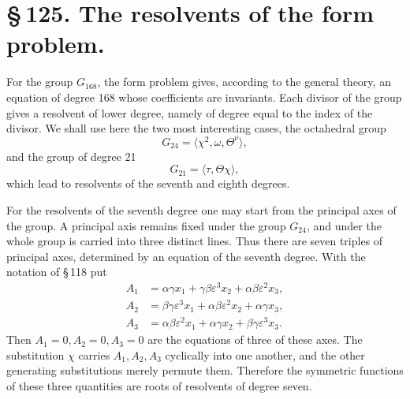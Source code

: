 \documentclass[11pt]{article}
\providecommand{\eps}{\varepsilon}
\providecommand{\eps}{\varepsilon}
\begin{document}
\section*{\S\,125. The resolvents of the form problem.}

For the group \(G_{168}\), the form problem gives, according to the general theory, an equation of degree 168 whose coefficients are invariants. Each divisor of the group gives a resolvent of lower degree, namely of degree equal to the index of the divisor. We shall use here the two most interesting cases, the octahedral group
\begin{equation}
G_{24}=\langle \chi^2,\omega,\Theta^\nu\rangle,
\tag{1}
\end{equation}
and the group of degree 21
\begin{equation}
G_{21}=\langle \tau,\Theta\chi\rangle,
\tag{2}
\end{equation}
which lead to resolvents of the seventh and eighth degrees.

For the resolvents of the seventh degree one may start from the principal axes of the group. A principal axis remains fixed under the group \(G_{24}\), and under the whole group is carried into three distinct lines. Thus there are seven triples of principal axes, determined by an equation of the seventh degree. With the notation of \S\,118 put
\begin{equation}
\begin{aligned}
A_1&=\alpha\gamma x_1+\gamma\beta\eps^3x_2+\alpha\beta\eps^2x_3,\\
A_2&=\beta\gamma\eps^3x_1+\alpha\beta\eps^2x_2+\alpha\gamma x_3,\\
A_3&=\alpha\beta\eps^2x_1+\alpha\gamma x_2+\beta\gamma\eps^3x_3.
\end{aligned}
\tag{3}
\end{equation}
Then \(A_1=0,A_2=0,A_3=0\) are the equations of three of these axes. The substitution \(\chi\) carries \(A_1,A_2,A_3\) cyclically into one another, and the other generating substitutions merely permute them. Therefore the symmetric functions of these three quantities are roots of resolvents of degree seven.
\end{document}
